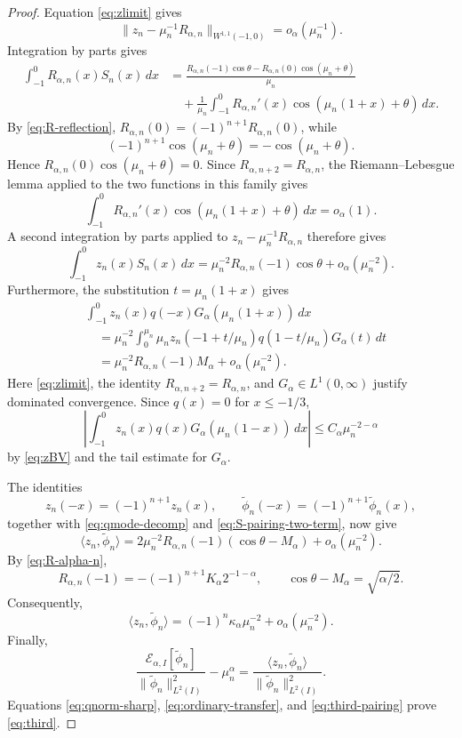 \documentclass[11pt]{amsart}
\numberwithin{equation}{section}
\theoremstyle{remark}
\newcommand{\wt}{\widetilde}
\newcommand{\norm}[2][]{\lVert #2\rVert_{#1}}
\newcommand{\ip}[2]{\langle #1,#2\rangle}
\newcommand{\calE}{\mathcal E}
\begin{document}
\begin{proof}
Equation \eqref{eq:zlimit} gives
\[
 \norm[W^{1,1}(-1,0)]{
 z_n-\mu_n^{-1}R_{\alpha,n}}=o_\alpha(\mu_n^{-1}).
\]
Integration by parts gives
\[
 \begin{aligned}
 \int_{-1}^0R_{\alpha,n}(x)S_n(x)\,dx
 &=\frac{R_{\alpha,n}(-1)\cos\theta-R_{\alpha,n}(0)\cos(\mu_n+\theta)}{\mu_n}\\
 &\quad+\frac1{\mu_n}\int_{-1}^0
 R_{\alpha,n}'(x)\cos(\mu_n(1+x)+\theta)\,dx.
 \end{aligned}
\]
By \eqref{eq:R-reflection},
$R_{\alpha,n}(0)=(-1)^{n+1}R_{\alpha,n}(0)$, while
\[
 (-1)^{n+1}\cos(\mu_n+\theta)
 =-\cos(\mu_n+\theta).
\]
Hence
$R_{\alpha,n}(0)\cos(\mu_n+\theta)=0$.
Since $R_{\alpha,n+2}=R_{\alpha,n}$, the Riemann--Lebesgue lemma applied
to the two functions in this family gives
\[
 \int_{-1}^0R_{\alpha,n}'(x)
 \cos(\mu_n(1+x)+\theta)\,dx=o_\alpha(1).
\]
A second integration by parts applied to
$z_n-\mu_n^{-1}R_{\alpha,n}$ therefore gives
\begin{equation}\label{eq:S-pairing-two-term}
 \int_{-1}^0z_n(x)S_n(x)\,dx
 =\mu_n^{-2}R_{\alpha,n}(-1)\cos\theta
 +o_\alpha(\mu_n^{-2}).
\end{equation}
Furthermore, the substitution $t=\mu_n(1+x)$ gives
\[
 \begin{aligned}
 &\int_{-1}^0z_n(x)q(-x)G_\alpha(\mu_n(1+x))\,dx\\
 &\quad=\mu_n^{-2}\int_0^{\mu_n}
 \mu_nz_n(-1+t/\mu_n)q(1-t/\mu_n)G_\alpha(t)\,dt\\
 &\quad=\mu_n^{-2}R_{\alpha,n}(-1)M_\alpha
 +o_\alpha(\mu_n^{-2}).
 \end{aligned}
\]
Here \eqref{eq:zlimit}, the identity
$R_{\alpha,n+2}=R_{\alpha,n}$, and $G_\alpha\in L^1(0,\infty)$ justify
dominated convergence.  Since $q(x)=0$ for $x\le-1/3$,
\[
 \left|\int_{-1}^0z_n(x)q(x)G_\alpha(\mu_n(1-x))\,dx\right|
 \le C_\alpha\mu_n^{-2-\alpha}
\]
by \eqref{eq:zBV} and the tail estimate for $G_\alpha$.

The identities
\[
 z_n(-x)=(-1)^{n+1}z_n(x),
 \qquad
 \wt\phi_n(-x)=(-1)^{n+1}\wt\phi_n(x),
\]
together with \eqref{eq:qmode-decomp} and
\eqref{eq:S-pairing-two-term}, now give
\[
 \ip{z_n}{\wt\phi_n}
 =2\mu_n^{-2}R_{\alpha,n}(-1)
 (\cos\theta-M_\alpha)+o_\alpha(\mu_n^{-2}).
\]
By \eqref{eq:R-alpha-n},
\[
 R_{\alpha,n}(-1)
 =-(-1)^{n+1}K_\alpha2^{-1-\alpha},
 \qquad
 \cos\theta-M_\alpha=\sqrt{\alpha/2}.
\]
Consequently,
\begin{equation}\label{eq:third-pairing}
 \ip{z_n}{\wt\phi_n}
 =(-1)^n\kappa_\alpha\mu_n^{-2}
 +o_\alpha(\mu_n^{-2}).
\end{equation}
Finally,
\[
 \frac{\calE_{\alpha,I}[\wt\phi_n]}{\norm[L^2(I)]{\wt\phi_n}^2}-\mu_n^\alpha
 =\frac{\ip{z_n}{\wt\phi_n}}{\norm[L^2(I)]{\wt\phi_n}^2}.
\]
Equations \eqref{eq:qnorm-sharp}, \eqref{eq:ordinary-transfer}, and
\eqref{eq:third-pairing} prove \eqref{eq:third}.
\end{proof}
\end{document}
